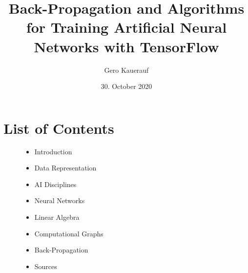 \documentclass[t]{beamer} %
\begin{document}

\title{Back-Propagation and Algorithms for Training Artificial Neural Networks with TensorFlow}
\date{30. October 2020}
\author{Gero Kauerauf}

\frame{\titlepage}

\section{List of Contents}
\begin{frame}
    \begin{figure}
        \centering
        \begin{itemize}[<+->]
            \item Introduction
            \item Data Representation
            \item AI Disciplines
            \item Neural Networks
            \item Linear Algebra
            \item Computational Graphs
            \item Back-Propagation
            \item Sources
        \end{itemize}
    \end{figure}
\end{frame}
\end{document}
